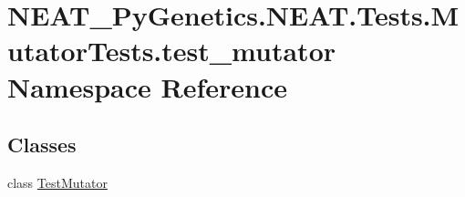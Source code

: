 \hypertarget{namespaceNEAT__PyGenetics_1_1NEAT_1_1Tests_1_1MutatorTests_1_1test__mutator}{}\section{N\+E\+A\+T\+\_\+\+Py\+Genetics.\+N\+E\+A\+T.\+Tests.\+Mutator\+Tests.\+test\+\_\+mutator Namespace Reference}
\label{namespaceNEAT__PyGenetics_1_1NEAT_1_1Tests_1_1MutatorTests_1_1test__mutator}
\subsection*{Classes}
\begin{DoxyCompactItemize}
\item 
class \hyperlink{classNEAT__PyGenetics_1_1NEAT_1_1Tests_1_1MutatorTests_1_1test__mutator_1_1TestMutator}{Test\+Mutator}
\end{DoxyCompactItemize}
